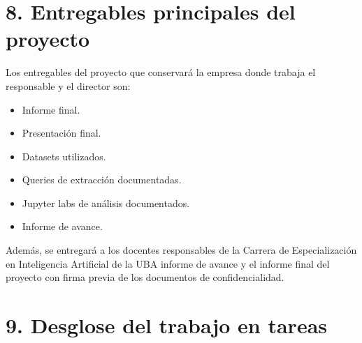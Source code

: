 \documentclass[
11pt, %
]{charter}
\begin{document}
\section{8. Entregables principales del proyecto}
\label{sec:entregables}

Los entregables del proyecto que conservará la empresa donde trabaja el responsable y el director son:

\begin{itemize}
 \item Informe final.
 \item Presentación final.
 \item Datasets utilizados.
 \item Queries de extracción documentadas.
 \item Jupyter labs de análisis documentados.
 \item Informe de avance.
\end{itemize}

Además, se entregará a los docentes responsables de la Carrera de Especialización en Inteligencia Artificial de la UBA informe de avance y el informe final del proyecto con firma previa de los documentos de confidencialidad.

\section{9. Desglose del trabajo en tareas}
\label{sec:wbs}
\end{document}
